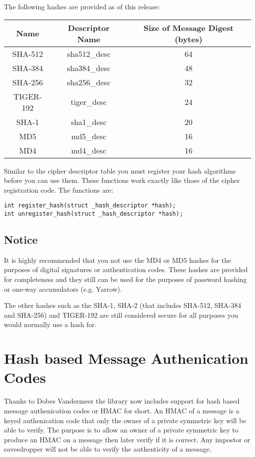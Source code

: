\documentclass{book}
\begin{document}
The following hashes are provided as of this release:
\begin{center}
\begin{tabular}{|c|c|c|}
      \hline Name & Descriptor Name & Size of Message Digest (bytes) \\
      \hline SHA-512 & sha512\_desc & 64 \\
      \hline SHA-384 & sha384\_desc & 48 \\
      \hline SHA-256 & sha256\_desc & 32 \\
      \hline TIGER-192 & tiger\_desc & 24 \\
      \hline SHA-1 & sha1\_desc & 20 \\
      \hline MD5 & md5\_desc & 16 \\
      \hline MD4 & md4\_desc & 16 \\
      \hline
\end{tabular}
\end{center}

Similar to the cipher descriptor table you must register your hash algorithms before you can use them.  These functions
work exactly like those of the cipher registration code.  The functions are:
\begin{verbatim}
int register_hash(struct _hash_descriptor *hash);
int unregister_hash(struct _hash_descriptor *hash);
\end{verbatim}

\subsection{Notice}
It is highly recommended that you not use the MD4 or MD5 hashes for the purposes of digital signatures or authentication codes.  
These hashes are provided for completeness and they still can be used for the purposes of password hashing or one-way accumulators
(e.g. Yarrow).

The other hashes such as the SHA-1, SHA-2 (that includes SHA-512, SHA-384 and SHA-256) and TIGER-192 are still considered secure
for all purposes you would normally use a hash for.

\section{Hash based Message Authenication Codes}
Thanks to Dobes Vandermeer the library now includes support for hash based message authenication codes or HMAC for short.  An HMAC
of a message is a keyed authenication code that only the owner of a private symmetric key will be able to verify.  The purpose is
to allow an owner of a private symmetric key to produce an HMAC on a message then later verify if it is correct.  Any impostor or
eavesdropper will not be able to verify the authenticity of a message.  
\end{document}
